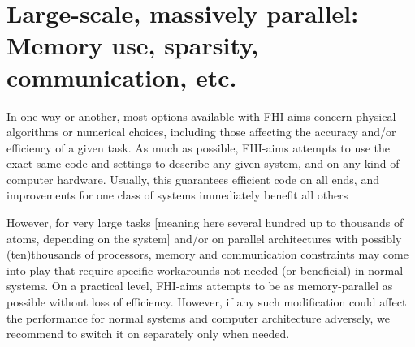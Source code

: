\section{Large-scale, massively parallel: Memory
  use, sparsity, communication, etc.} 
\label{Sec:Large-scale}

In one way or another, most options available with FHI-aims concern
physical algorithms or numerical choices, including those affecting
the accuracy and/or efficiency of a given task. As much as possible,
FHI-aims attempts to use the exact same code and settings to describe
any given system, and on any kind of computer hardware. Usually, this
guarantees efficient code on all ends, and improvements for one class
of systems immediately benefit all others

However, for very large tasks [meaning here several hundred
up to thousands of atoms, depending on the system] and/or on parallel
architectures with possibly (ten)thousands of processors, memory and
communication constraints may come into play that require specific
workarounds not needed (or beneficial) in normal systems. On a
practical level, FHI-aims 
attempts to be as memory-parallel as possible without loss of
efficiency. However, if any such modification could affect the
performance for normal systems and computer architecture adversely, we
recommend to switch it on separately only when needed.

